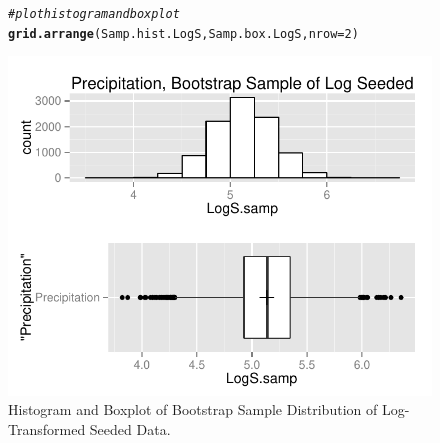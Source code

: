 \documentclass{article}\usepackage[]{graphicx}\usepackage[]{color}
\makeatletter
\def\maxwidth{ %
  \ifdim\Gin@nat@width>\linewidth
    \linewidth
  \else
    \Gin@nat@width
  \fi
}
\newcommand{\hlnum}[1]{\textcolor[rgb]{0.686,0.059,0.569}{#1}}%
\newcommand{\hlcom}[1]{\textcolor[rgb]{0.678,0.584,0.686}{\textit{#1}}}%
\newcommand{\hlstd}[1]{\textcolor[rgb]{0.345,0.345,0.345}{#1}}%
\newcommand{\hlkwc}[1]{\textcolor[rgb]{0.333,0.667,0.333}{#1}}%
\newcommand{\hlkwd}[1]{\textcolor[rgb]{0.737,0.353,0.396}{\textbf{#1}}}%
\newenvironment{kframe}{%
 \def\at@end@of@kframe{}%
 \ifinner\ifhmode%
  \def\at@end@of@kframe{\end{minipage}}%
  \begin{minipage}{\columnwidth}%
 \fi\fi%
 \def\FrameCommand##1{\hskip\@totalleftmargin \hskip-\fboxsep
 \colorbox{shadecolor}{##1}\hskip-\fboxsep
     \hskip-\linewidth \hskip-\@totalleftmargin \hskip\columnwidth}%
 \MakeFramed {\advance\hsize-\width
   \@totalleftmargin\z@ \linewidth\hsize
   \@setminipage}}%
 {\par\unskip\endMakeFramed%
 \at@end@of@kframe}
\newenvironment{knitrout}{}{} %
\makeatother
\begin{document}
\begin{figure}[H]  \begin{center} \vspace{-0.45in}
\begin{knitrout}
\color{fgcolor}\begin{kframe}
\begin{alltt}
\hlcom{# plot histogram and boxplot}
\hlkwd{grid.arrange}\hlstd{(Samp.hist.LogS, Samp.box.LogS,} \hlkwc{nrow} \hlstd{=} \hlnum{2}\hlstd{)}
\end{alltt}
\end{kframe}
\includegraphics[width=\maxwidth]{figure/1a_box_LogS_plot} 

\end{knitrout}
\end{center}\caption{Histogram and Boxplot of Bootstrap Sample Distribution of Log-Transformed Seeded Data.} \end{figure}
\end{document}
